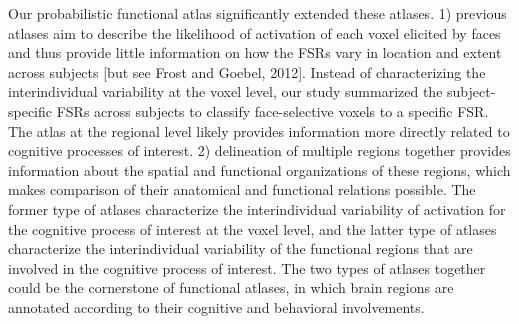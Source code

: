 %
Our probabilistic functional atlas significantly extended these atlases.
%
1) previous atlases aim to describe the likelihood of activation of each voxel
elicited by faces and thus provide little information on how the FSRs vary in
location and extent across subjects [but see Frost and Goebel, 2012].
%
Instead of characterizing the interindividual variability at the voxel level,
our study summarized the subject-specific FSRs across subjects to classify
face-selective voxels to a specific FSR.
%
The atlas at the regional level likely provides information more directly
related to cognitive processes of interest.
%
2) delineation of multiple regions together provides information about the
spatial and functional organizations of these regions, which makes comparison of
their anatomical and functional relations possible.
%
The former type of atlases characterize the interindividual variability of
activation for the cognitive process of interest at the voxel level, and the
latter type of atlases characterize the interindividual variability of the
functional regions that are involved in the cognitive process of interest.
%
The two types of atlases together could be the cornerstone of functional
atlases, in which brain regions are annotated according to their cognitive and
behavioral involvements.


